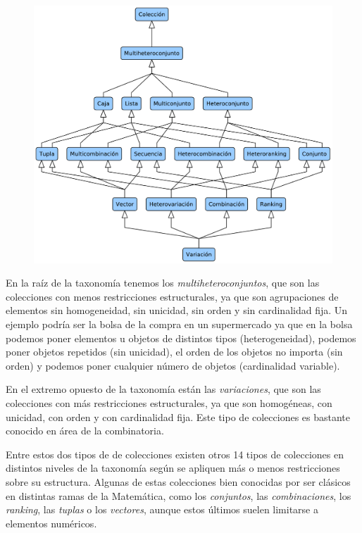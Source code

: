 \documentclass[a4paper,10pt,twoside]{article}
\theoremstyle{definition}
\begin{document}
\begin{figure}[htbp!]
\begin{center}
\includegraphics[width=\textwidth]{img/taxonomia_colecciones.pdf}
\label{fig:taxonomia-colecciones}
\end{center}
\end{figure} 

En la raíz de la taxonomía tenemos los \emph{multiheteroconjuntos}, que son las colecciones con menos restricciones estructurales, ya que son agrupaciones de elementos sin homogeneidad, sin unicidad, sin orden y sin cardinalidad fija.
Un ejemplo podría ser la bolsa de la compra en un supermercado ya que en la bolsa podemos poner elementos u objetos de distintos tipos (heterogeneidad), podemos poner objetos repetidos (sin unicidad), el orden de los objetos no importa (sin orden) y podemos poner cualquier número de objetos (cardinalidad variable).

En el extremo opuesto de la taxonomía están las \emph{variaciones}, que son las colecciones con más restricciones estructurales, ya que son homogéneas, con unicidad, con orden y con cardinalidad fija.
Este tipo de colecciones es bastante conocido en área de la combinatoria.

Entre estos dos tipos de de colecciones existen otros 14 tipos de colecciones en distintos niveles de la taxonomía según se apliquen más o menos restricciones sobre su estructura.
Algunas de estas colecciones bien conocidas por ser clásicos en distintas ramas de la Matemática, como los \emph{conjuntos}, las \emph{combinaciones}, los \emph{ranking}, las \emph{tuplas} o los \emph{vectores}, aunque estos últimos suelen limitarse a elementos numéricos.
\end{document}
